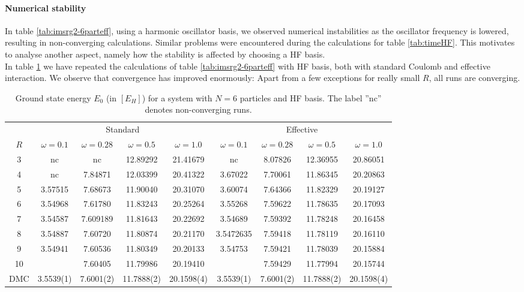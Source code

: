 \paragraph{Numerical stability}
In table \ref{tab:imsrg2-6parteff}, using a harmonic oscillator basis, we observed numerical instabilities as the oscillator frequency is lowered, resulting in non-converging calculations. Similar problems were encountered during the calculations for table \ref{tab:timeHF}. This motivates to analyse another aspect, namely how the stability is affected by choosing a HF basis. \\
In table \ref{tab:imsrg2-6partho} we have repeated the calculations of table \ref{tab:imsrg2-6parteff} with HF basis, both with standard Coulomb and effective interaction. 
We observe that convergence has improved enormously: Apart from a few exceptions for really small $R$, all runs are converging. 

\begin{table}
\begin{center}
\tabcolsep=0.07cm
\begin{tabular}{|c|cccc|cccc|}
\hline\hline
& \multicolumn{4}{c}{Standard} & \multicolumn{4}{c|}{Effective} \\
$R$  & $\omega = 0.1$ & $\omega = 0.28$ & $\omega=0.5$ & $\omega=1.0$ & $\omega = 0.1$ & $\omega = 0.28$ & $\omega=0.5$ & $\omega=1.0$\\
\hline
3 &nc &nc & 12.89292& 21.41679 &nc & 8.07826& 12.36955& 20.86051\\
4 &nc &7.84871 &12.03399 &20.41322 &3.67022 &7.70061 &11.86345 & 20.20863\\
5 & 3.57515&7.68673 &11.90040 &20.31070& 3.60074&7.64366 & 11.82329& 20.19127 \\
6 &3.54968 &7.61780 &11.83243 & 20.25264 &3.55268 &7.59622 &11.78635 & 20.17093\\
7 &3.54587 &7.609189 &11.81643 & 20.22692 &3.54689 &7.59392 & 11.78248& 20.16458\\
8 &3.54887 &7.60720 & 11.80874&20.21170 &3.5472635 &7.59418 & 11.78119& 20.16110\\
9 & 3.54941&7.60536 &11.80349 & 20.20133&3.54753 & 7.59421&11.78039 &20.15884 \\
10 & &7.60405 &11.79986 & 20.19410 & &7.59429 & 11.77994& 20.15744 \\
\hline
DMC& 3.5539(1) & 7.6001(2)&11.7888(2) &20.1598(4) &  3.5539(1) & 7.6001(2)&11.7888(2) &20.1598(4) \\ 
\hline\hline
\end{tabular}
\end{center}
\caption{Ground state energy $E_0$ (in $\left[E_H\right]$) for a system with $N=6$ particles and HF basis. The label ''nc'' denotes non-converging runs.}
\label{tab:imsrg2-6partho}
\end{table}

